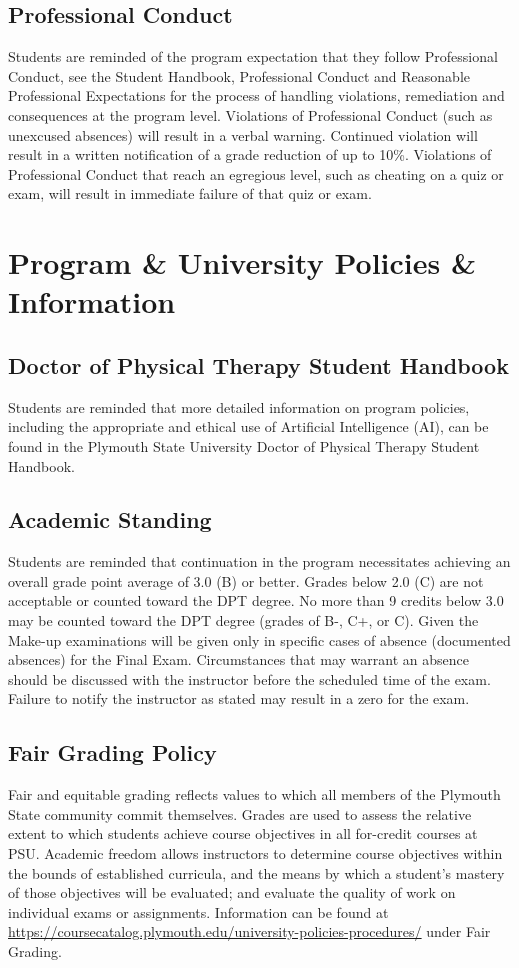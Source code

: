 \documentclass[letterpaper]{inzane_syllabus} %
\begin{document}
\subsection{Professional Conduct}

\footnotesize{Students are reminded of the program expectation that they follow Professional Conduct, see the Student Handbook, Professional Conduct and Reasonable Professional Expectations for the process of handling violations, remediation and consequences at the program level. Violations of Professional Conduct (such as unexcused absences) will result in a verbal warning. Continued violation will result in a written notification of a grade reduction of up to 10\%. Violations of Professional Conduct that reach an egregious level, such as cheating on a quiz or exam, will result in immediate failure of that quiz or exam.}
\bigskip

\section{Program \& University Policies \& Information}

\subsection{Doctor of Physical Therapy Student Handbook}
Students are reminded that more detailed information on program policies, including the appropriate and ethical use of Artificial Intelligence (AI), can be found in the Plymouth State University Doctor of Physical Therapy Student Handbook.

\subsection{Academic Standing}
Students are reminded that continuation in the program necessitates achieving an overall grade point average of 3.0 (B) or better.  Grades below 2.0 (C) are not acceptable or counted toward the DPT degree.  No more than 9 credits below 3.0 may be counted toward the DPT degree (grades of B-, C+, or C). Given the Make-up examinations will be given only in specific cases of absence (documented absences) for the Final Exam.  Circumstances that may warrant an absence should be discussed with the instructor before the scheduled time of the exam.  Failure to notify the instructor as stated may result in a zero for the exam.

\subsection{Fair Grading Policy}
\footnotesize{Fair and equitable grading reflects values to which all members of the Plymouth State community commit themselves. Grades are used to assess the relative extent to which students achieve course objectives in all for-credit courses at PSU. Academic freedom allows instructors to determine course objectives within the bounds of established curricula, and the means by which a student’s mastery of those objectives will be evaluated; and evaluate the quality of work on individual exams or assignments. Information can be found at \url{https://coursecatalog.plymouth.edu/university-policies-procedures/} under Fair Grading.}
\end{document}
